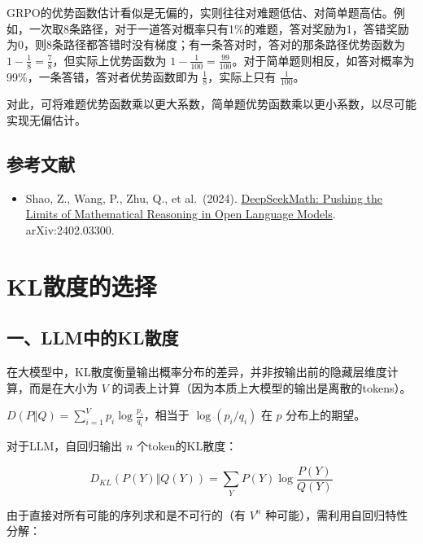 GRPO的优势函数估计看似是无偏的，实则往往对难题低估、对简单题高估。例如，一次取8条路径，对于一道答对概率只有1\%的难题，答对奖励为1，答错奖励为0，则8条路径都答错时没有梯度；有一条答对时，答对的那条路径优势函数为 \(1-\frac{1}{8}=\frac{7}{8}\)，但实际上优势函数为 \(1-\frac{1}{100}=\frac{99}{100}\)。对于简单题则相反，如答对概率为99\%，一条答错，答对者优势函数即为 \(\frac{1}{8}\)，实际上只有 \(\frac{1}{100}\)。

对此，可将难题优势函数乘以更大系数，简单题优势函数乘以更小系数，以尽可能实现无偏估计。

\hypertarget{ux53c2ux8003ux6587ux732e-85}{%
\subsection{参考文献}\label{ux53c2ux8003ux6587ux732e-85}}

\vspace{0.25em}
\begin{itemize}
\tightlist
\item
  Shao, Z., Wang, P., Zhu, Q., et al.~(2024). \href{https://arxiv.org/abs/2402.03300}{DeepSeekMath: Pushing the Limits of Mathematical Reasoning in Open Language Models}. arXiv:2402.03300.
\end{itemize}

\clearpage

\hypertarget{klux6563ux5ea6ux7684ux9009ux62e9}{%
\section{KL散度的选择}\label{klux6563ux5ea6ux7684ux9009ux62e9}}

\hypertarget{ux4e00llmux4e2dux7684klux6563ux5ea6}{%
\subsection{一、LLM中的KL散度}\label{ux4e00llmux4e2dux7684klux6563ux5ea6}}

在大模型中，KL散度衡量输出概率分布的差异，并非按输出前的隐藏层维度计算，而是在大小为 \(V\) 的词表上计算（因为本质上大模型的输出是离散的tokens）。

\(D(P \Vert Q)=\sum_{i=1}^{V}p_i\log\frac{p_i}{q_i}\)，相当于 \(\log(p_i/q_i)\) 在 \(p\) 分布上的期望。

对于LLM，自回归输出 \(n\) 个token的KL散度：

\[
D_{KL}(P(Y) \Vert Q(Y))=\sum_Y P(Y)\log\frac{P(Y)}{Q(Y)}
\]

由于直接对所有可能的序列求和是不可行的（有 \(V^n\) 种可能），需利用自回归特性分解：

